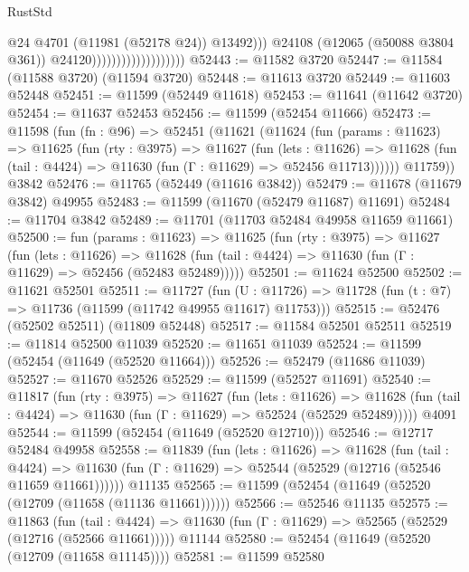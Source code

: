 \begin{lexlean}{RustStd}
\begin{coremodule}
                                                @24
                                                @4701
                                                (@11981 (@52178 @24))
                                                @13492)))
                                          @24108
                                          (@12065 (@50088 @3804 @361))
                                          @24120)))))))))))))))))))
@52443 := @11582 @3720
@52447 := @11584 (@11588 @3720) (@11594 @3720)
@52448 := @11613 @3720
@52449 := @11603 @52448
@52451 := @11599 (@52449 @11618)
@52453 := @11641 (@11642 @3720)
@52454 := @11637 @52453
@52456 := @11599 (@52454 @11666)
@52473 := @11598
    (fun (fn : @96) =>
    @52451
      (@11621
        (@11624
          (fun (params : @11623) =>
          @11625
            (fun (rty : @3975) =>
            @11627
              (fun (lets : @11626) =>
              @11628 (fun (tail : @4424) => @11630 (fun (Γ : @11629) => @52456 @11713))))))
        @11759))
    @3842
@52476 := @11765 (@52449 (@11616 @3842))
@52479 := @11678 (@11679 @3842) @49955
@52483 := @11599 (@11670 (@52479 @11687) @11691)
@52484 := @11704 @3842
@52489 := @11701 (@11703 @52484 @49958 @11659 @11661)
@52500 := fun (params : @11623) =>
  @11625
    (fun (rty : @3975) =>
    @11627
      (fun (lets : @11626) =>
      @11628 (fun (tail : @4424) => @11630 (fun (Γ : @11629) => @52456 (@52483 @52489)))))
@52501 := @11624 @52500
@52502 := @11621 @52501
@52511 := @11727
    (fun (U : @11726) => @11728 (fun (t : @7) => @11736 (@11599 (@11742 @49955 @11617) @11753)))
@52515 := @52476 (@52502 @52511) (@11809 @52448)
@52517 := @11584 @52501 @52511
@52519 := @11814 @52500 @11039
@52520 := @11651 @11039
@52524 := @11599 (@52454 (@11649 (@52520 @11664)))
@52526 := @52479 (@11686 @11039)
@52527 := @11670 @52526
@52529 := @11599 (@52527 @11691)
@52540 := @11817
    (fun (rty : @3975) =>
    @11627
      (fun (lets : @11626) =>
      @11628 (fun (tail : @4424) => @11630 (fun (Γ : @11629) => @52524 (@52529 @52489)))))
    @4091
@52544 := @11599 (@52454 (@11649 (@52520 @12710)))
@52546 := @12717 @52484 @49958
@52558 := @11839
    (fun (lets : @11626) =>
    @11628
      (fun (tail : @4424) =>
      @11630 (fun (Γ : @11629) => @52544 (@52529 (@12716 (@52546 @11659 @11661))))))
    @11135
@52565 := @11599 (@52454 (@11649 (@52520 (@12709 (@11658 (@11136 @11661))))))
@52566 := @52546 @11135
@52575 := @11863
    (fun (tail : @4424) => @11630 (fun (Γ : @11629) => @52565 (@52529 (@12716 (@52566 @11661)))))
    @11144
@52580 := @52454 (@11649 (@52520 (@12709 (@11658 @11145))))
@52581 := @11599 @52580

\end{coremodule}
\end{lexlean}

